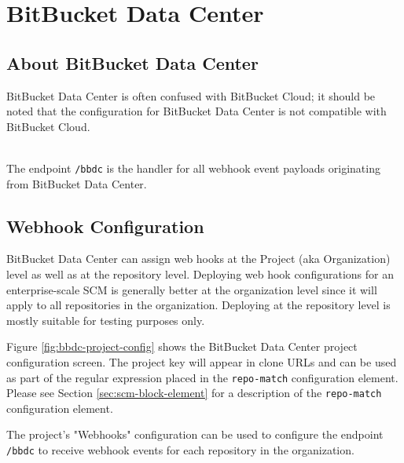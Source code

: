 \chapter{BitBucket Data Center}

\section{About BitBucket Data Center}

BitBucket Data Center is often confused with BitBucket Cloud; it should be noted that
the \cxoneflow configuration for BitBucket Data Center is not compatible with BitBucket Cloud.

\noindent\\The \cxoneflow endpoint \texttt{/bbdc} is the handler for all webhook event
payloads originating from BitBucket Data Center.  


\section{Webhook Configuration}

BitBucket Data Center can assign web hooks at the Project (aka Organization) level as well as at the
repository level.  Deploying web hook configurations for an enterprise-scale SCM is generally better
at the organization level since it will apply to all repositories in the organization.  Deploying
at the repository level is mostly suitable for testing purposes only.

Figure \ref{fig:bbdc-project-config} shows the BitBucket Data Center project configuration screen.  The
project key will appear in clone URLs and can be used as part of the regular expression 
placed in the \texttt{repo-match} configuration element.  Please see Section \ref{sec:scm-block-element} 
for a description of the \texttt{repo-match} configuration element.

The project's "Webhooks" configuration can be used to configure the \cxoneflow endpoint 
\texttt{/bbdc} to receive webhook events for each repository in the organization.  

